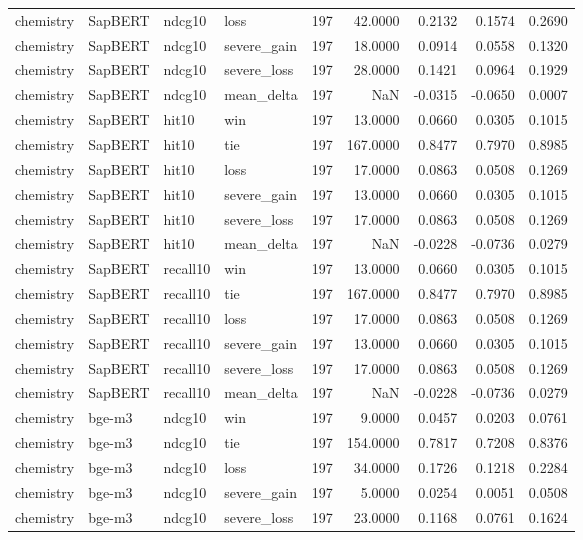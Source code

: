 \begin{tabular}{llllrrrrr}
chemistry & SapBERT & ndcg10 & loss & 197 & 42.0000 & 0.2132 & 0.1574 & 0.2690 \\
chemistry & SapBERT & ndcg10 & severe\_gain & 197 & 18.0000 & 0.0914 & 0.0558 & 0.1320 \\
chemistry & SapBERT & ndcg10 & severe\_loss & 197 & 28.0000 & 0.1421 & 0.0964 & 0.1929 \\
chemistry & SapBERT & ndcg10 & mean\_delta & 197 & NaN & -0.0315 & -0.0650 & 0.0007 \\
chemistry & SapBERT & hit10 & win & 197 & 13.0000 & 0.0660 & 0.0305 & 0.1015 \\
chemistry & SapBERT & hit10 & tie & 197 & 167.0000 & 0.8477 & 0.7970 & 0.8985 \\
chemistry & SapBERT & hit10 & loss & 197 & 17.0000 & 0.0863 & 0.0508 & 0.1269 \\
chemistry & SapBERT & hit10 & severe\_gain & 197 & 13.0000 & 0.0660 & 0.0305 & 0.1015 \\
chemistry & SapBERT & hit10 & severe\_loss & 197 & 17.0000 & 0.0863 & 0.0508 & 0.1269 \\
chemistry & SapBERT & hit10 & mean\_delta & 197 & NaN & -0.0228 & -0.0736 & 0.0279 \\
chemistry & SapBERT & recall10 & win & 197 & 13.0000 & 0.0660 & 0.0305 & 0.1015 \\
chemistry & SapBERT & recall10 & tie & 197 & 167.0000 & 0.8477 & 0.7970 & 0.8985 \\
chemistry & SapBERT & recall10 & loss & 197 & 17.0000 & 0.0863 & 0.0508 & 0.1269 \\
chemistry & SapBERT & recall10 & severe\_gain & 197 & 13.0000 & 0.0660 & 0.0305 & 0.1015 \\
chemistry & SapBERT & recall10 & severe\_loss & 197 & 17.0000 & 0.0863 & 0.0508 & 0.1269 \\
chemistry & SapBERT & recall10 & mean\_delta & 197 & NaN & -0.0228 & -0.0736 & 0.0279 \\
chemistry & bge-m3 & ndcg10 & win & 197 & 9.0000 & 0.0457 & 0.0203 & 0.0761 \\
chemistry & bge-m3 & ndcg10 & tie & 197 & 154.0000 & 0.7817 & 0.7208 & 0.8376 \\
chemistry & bge-m3 & ndcg10 & loss & 197 & 34.0000 & 0.1726 & 0.1218 & 0.2284 \\
chemistry & bge-m3 & ndcg10 & severe\_gain & 197 & 5.0000 & 0.0254 & 0.0051 & 0.0508 \\
chemistry & bge-m3 & ndcg10 & severe\_loss & 197 & 23.0000 & 0.1168 & 0.0761 & 0.1624 \\

\end{tabular}

